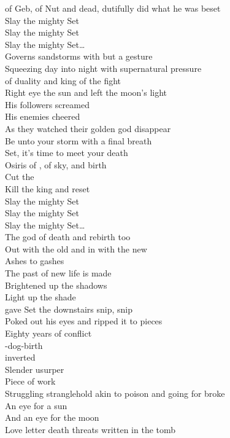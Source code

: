  of Geb, of Nut and dead, dutifully did what he was beset \\

Slay the mighty Set \\
Slay the mighty Set \\
Slay the mighty Set… \\

Governs sandstorms with but a gesture \\
Squeezing day into night with supernatural pressure \\
 of duality and king of the fight \\
Right eye the sun and left the moon's light \\
His followers screamed \\
His enemies cheered \\
As they watched their golden god disappear \\
Be unto your storm with a final breath \\
Set, it's time to meet your death \\

Osiris of , of sky, and birth \\
Cut the  \\
Kill the king and reset \\

Slay the mighty Set \\
Slay the mighty Set \\
Slay the mighty Set… \\

The god of death and rebirth too \\
Out with the old and in with the new \\
Ashes to gashes \\
The past of new life is made \\
Brightened up the shadows \\
Light up the shade \\
 gave Set the downstairs snip, snip \\
Poked out his eyes and ripped it to pieces \\
Eighty years of conflict \\
-dog-birth \\
 inverted \\
Slender usurper \\
Piece of work \\
Struggling stranglehold akin to poison and going for broke \\
An eye for a sun \\
And an eye for the moon \\
Love letter death threats written in the tomb \\

